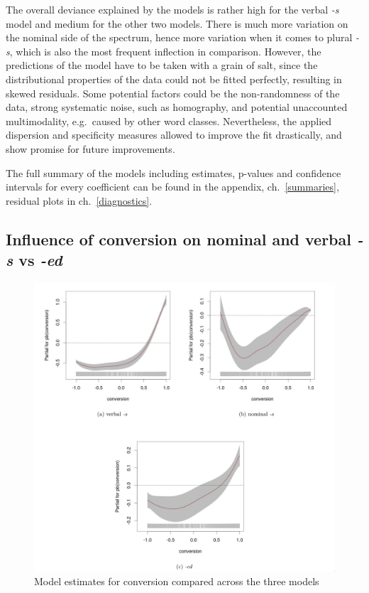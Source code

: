 \documentclass[
]{article}
\begin{document}
The overall deviance explained by the models is rather high for the
verbal \emph{-s} model and medium for the other two models. There is
much more variation on the nominal side of the spectrum, hence more
variation when it comes to plural \emph{-s}, which is also the most
frequent inflection in comparison. However, the predictions of the model
have to be taken with a grain of salt, since the distributional
properties of the data could not be fitted perfectly, resulting in
skewed residuals. Some potential factors could be the non-randomness of
the data, strong systematic noise, such as homography, and potential
unaccounted multimodality, e.g.~caused by other word classes.
Nevertheless, the applied dispersion and specificity measures allowed to
improve the fit drastically, and show promise for future improvements.

The full summary of the models including estimates, p-values and
confidence intervals for every coefficient can be found in the appendix,
ch.~\ref{summaries}, residual plots in ch.~\ref{diagnostics}.

\hypertarget{influence-of-conversion-on-nominal-and-verbal--s-vs--ed}{%
\subsection{\texorpdfstring{Influence of conversion on nominal and
verbal \emph{-s} vs
\emph{-ed}}{Influence of conversion on nominal and verbal -s vs -ed}}\label{influence-of-conversion-on-nominal-and-verbal--s-vs--ed}}

\begin{figure}[t!]
    \centering
    \includegraphics[width=\textwidth]{figures/docx_subfigures_1.png}
    \caption{Model estimates for conversion compared across the three models}
    \label{conv_pair}
\end{figure}
\end{document}
